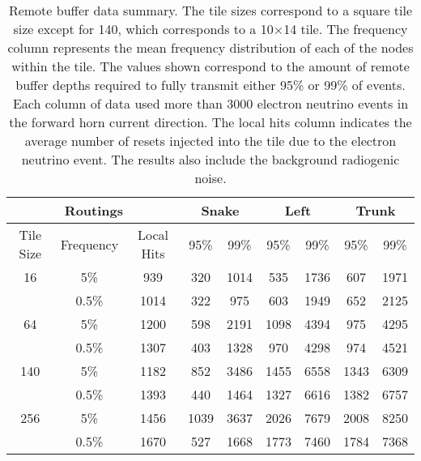 \begin{table}
	\begin{center}
		\begin{tabular}{|c c c |c c|c c|c c|}
			\hline
			\multicolumn{3}{|c}{Routings} & \multicolumn{2}{c}{Snake} & \multicolumn{2}{c}{Left} & \multicolumn{2}{c|}{Trunk} \\
			\hline
			Tile Size & Frequency & Local Hits & 95\% & 99\% & 95\% & 99\% & 95\% & 99\% \\
			\hline
			16 & 5\% & 939 & 320 & 1014 & 535 & 1736 & 607 & 1971 \\
			 & 0.5\% & 1014 & 322 & 975 & 603 & 1949 & 652 & 2125 \\
			\hline
			64 & 5\% & 1200 & 598 & 2191 & 1098 & 4394 & 975 & 4295 \\
			& 0.5\% & 1307 & 403 & 1328 & 970 & 4298 & 974 & 4521 \\
			\hline
			140 & 5\% & 1182 & 852 & 3486 & 1455 & 6558 & 1343 & 6309 \\
			 & 0.5\% & 1393 & 440 & 1464 & 1327 & 6616 & 1382 & 6757 \\
			\hline
			256 & 5\% & 1456 & 1039 & 3637 & 2026 & 7679 & 2008 & 8250 \\
			 & 0.5\% & 1670 & 527 & 1668 & 1773 & 7460 & 1784 & 7368 \\
			\hline
		\end{tabular}
	\end{center}
	\caption{Remote buffer data summary.
	The tile sizes correspond to a square tile size except for 140, which corresponds to a 10$\times$14 tile.
	The frequency column represents the mean frequency distribution of each of the nodes within the tile.
	The values shown correspond to the amount of remote buffer depths required to fully transmit either 95\% or 99\% of events.
	Each column of data used more than 3000 electron neutrino events in the forward horn current direction.
	The local hits column indicates the average number of resets injected into the tile due to the electron neutrino event.
	The results also include the background radiogenic noise.
	}
	\label{tab:buffers}
\end{table}